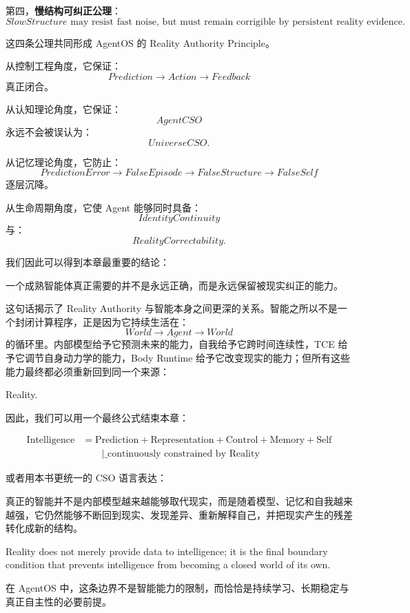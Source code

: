 第四，\textbf{慢结构可纠正公理}：
\[
\boxed{
SlowStructure
\text{ may resist fast noise, but must remain corrigible by persistent reality evidence.}
}
\]

这四条公理共同形成 AgentOS 的 Reality Authority Principle。

从控制工程角度，它保证：
\[
Prediction
\rightarrow
Action
\rightarrow
Feedback
\]
真正闭合。

从认知理论角度，它保证：
\[
AgentCSO
\]
永远不会被误认为：
\[
UniverseCSO.
\]

从记忆理论角度，它防止：
\[
PredictionError
\rightarrow
FalseEpisode
\rightarrow
FalseStructure
\rightarrow
FalseSelf
\]
逐层沉降。

从生命周期角度，它使 Agent 能够同时具备：
\[
IdentityContinuity
\]
与：
\[
RealityCorrectability.
\]

我们因此可以得到本章最重要的结论：

\begin{conclusion}
一个成熟智能体真正需要的并不是永远正确，而是永远保留被现实纠正的能力。
\end{conclusion}

这句话揭示了 Reality Authority 与智能本身之间更深的关系。智能之所以不是一个封闭计算程序，正是因为它持续生活在：
\[
World\rightarrow Agent\rightarrow World
\]
的循环里。内部模型给予它预测未来的能力，自我给予它跨时间连续性，TCE 给予它调节自身动力学的能力，Body Runtime 给予它改变现实的能力；但所有这些能力最终都必须重新回到同一个来源：

\begin{statementbox}
Reality.
\end{statementbox}

因此，我们可以用一个最终公式结束本章：

\[
\boxed{
\begin{aligned}
\text{Intelligence}
&=
\text{Prediction}
+
\text{Representation}
+
\text{Control}
+
\text{Memory}
+
\text{Self}
\\
&\qquad
\Big|\_{\text{continuously constrained by Reality}}
\end{aligned}
}
\]

或者用本书更统一的 CSO 语言表达：

\begin{statementbox}
\centering
{}
\end{statementbox}

真正的智能并不是内部模型越来越能够取代现实，而是随着模型、记忆和自我越来越强，它仍然能够不断回到现实、发现差异、重新解释自己，并把现实产生的残差转化成新的结构。

\begin{statementbox}
Reality does not merely provide data to intelligence;
it is the final boundary condition that prevents intelligence from becoming a closed world of its own.
\end{statementbox}

在 AgentOS 中，这条边界不是智能能力的限制，而恰恰是持续学习、长期稳定与真正自主性的必要前提。
